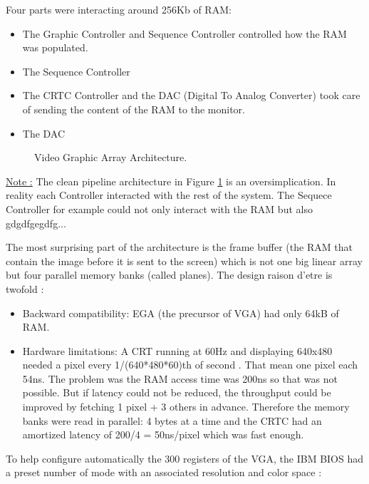 \documentclass[book.tex]{subfiles}
\begin{document}
  Four parts were interacting around 256Kb of RAM:

\begin{itemize}
\item The Graphic Controller and Sequence Controller controlled how the RAM was populated.
\item The Sequence Controller
\item The CRTC Controller and the DAC (Digital To Analog Converter) took care of sending the content of the RAM to the monitor.
\item The DAC
\end{itemize}

 \begin{figure}[H]
\centering
 
 \caption{Video Graphic Array Architecture.}\label{fig:vga_arch}
 \end{figure}

 {\underline{Note :}} The clean pipeline architecture in Figure \ref{fig:vga_arch} is an oversimplication. In reality each Controller interacted with the rest of the system. The Sequece Controller for example could not only interact with the RAM but also gdgdfgegdfg...



The most surprising part of the architecture is the frame buffer (the RAM that contain the image before it is sent to the screen) which is not one big linear array but four parallel memory banks (called planes). The design raison d’etre is twofold :

\begin{itemize}



\item Backward compatibility: EGA (the precursor of VGA) had only 64kB of RAM.
\item Hardware limitations: A CRT running at 60Hz and displaying 640x480 needed a pixel every 1/(640*480*60)th of second . That mean one pixel each 54ns. The problem was the RAM access time was 200ns so that was not possible. But if latency could not be reduced, the throughput could be improved by fetching 1 pixel + 3 others in advance. Therefore the memory banks were read in parallel: 4 bytes at a time and the CRTC had an amortized latency of 200/4 = 50ns/pixel which was fast enough.
\end{itemize}

\bigskip
To help configure automatically the 300 registers of the VGA, the IBM BIOS had a preset number of mode with an associated resolution and color space :
\end{document}
